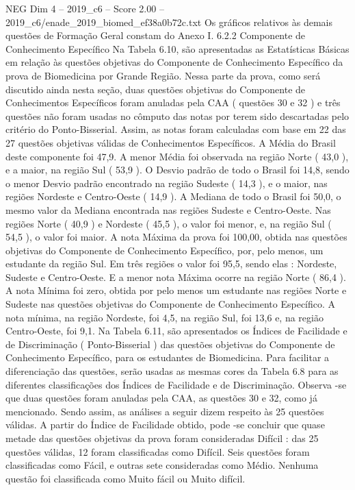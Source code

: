 \begin{textsample}{NEG Dim 4 – 2019\_c6 – Score 2.00 – 2019\_c6/enade\_2019\_biomed\_ef38a0b72c.txt}
Os gráficos relativos às demais questões de Formação Geral constam do Anexo I. 6.2.2 Componente de Conhecimento Específico Na Tabela 6.10, são apresentadas as Estatísticas Básicas em relação às questões objetivas do Componente de Conhecimento Específico da prova de Biomedicina por Grande Região.
Nessa parte da prova, como será discutido ainda nesta seção, duas questões objetivas do Componente de Conhecimentos Específicos foram anuladas pela CAA ( questões 30 e 32 ) e três questões não foram usadas no cômputo das notas por terem sido descartadas pelo critério do Ponto-Bisserial.
Assim, as notas foram calculadas com base em 22 das 27 questões objetivas válidas de Conhecimentos Específicos.
A Média do Brasil deste componente foi 47,9.
A menor Média foi observada na região Norte ( 43,0 ), e a maior, na região Sul ( 53,9 ).
O Desvio padrão de todo o Brasil foi 14,8, sendo o menor Desvio padrão encontrado na região Sudeste ( 14,3 ), e o maior, nas regiões Nordeste e Centro-Oeste ( 14,9 ).
A Mediana de todo o Brasil foi 50,0, o mesmo valor da Mediana encontrada nas regiões Sudeste e Centro-Oeste.
Nas regiões Norte ( 40,9 ) e Nordeste ( 45,5 ), o valor foi menor, e, na região Sul ( 54,5 ), o valor foi maior.
A nota Máxima da prova foi 100,00, obtida nas questões objetivas do Componente de Conhecimento Específico, por, pelo menos, um estudante da região Sul.
Em três regiões o valor foi 95,5, sendo elas : Nordeste, Sudeste e Centro-Oeste.
E a menor nota Máxima ocorre na região Norte ( 86,4 ).
A nota Mínima foi zero, obtida por pelo menos um estudante nas regiões Norte e Sudeste nas questões objetivas do Componente de Conhecimento Específico.
A nota mínima, na região Nordeste, foi 4,5, na região Sul, foi 13,6 e, na região Centro-Oeste, foi 9,1.
Na Tabela 6.11, são apresentados os Índices de Facilidade e de Discriminação ( Ponto-Bisserial ) das questões objetivas do Componente de Conhecimento Específico, para os estudantes de Biomedicina.
Para facilitar a diferenciação das questões, serão usadas as mesmas cores da Tabela 6.8 para as diferentes classificações dos Índices de Facilidade e de Discriminação.
Observa -se que duas questões foram anuladas pela CAA, as questões 30 e 32, como já mencionado.
Sendo assim, as análises a seguir dizem respeito às 25 questões válidas.
A partir do Índice de Facilidade obtido, pode -se concluir que quase metade das questões objetivas da prova foram consideradas Difícil : das 25 questões válidas, 12 foram classificadas como Difícil.
Seis questões foram classificadas como Fácil, e outras sete consideradas como Médio.
Nenhuma questão foi classificada como Muito fácil ou Muito difícil.

\end{textsample}
